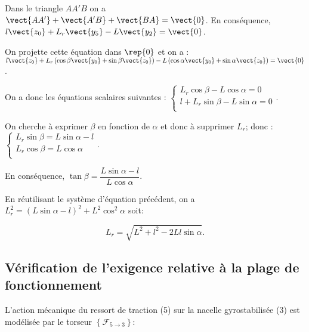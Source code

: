 \ifprof
\begin{corrige}
Dans le triangle $AA'B$ on a $\vect{AA'}+\vect{A'B}+\vect{BA}=\vect{0}$. 
En conséquence,  $l\vect{z_0}+L_r\vect{y_5}-L\vect{y_2}=\vect{0}$.

On projette cette équation dans $\rep{0}$ et on a : 
 $l\vect{z_0}+L_r\left(\cos\beta\vect{y_0}+\sin\beta\vect{z_0}\right)-L\left(\cos\alpha\vect{y_0}+\sin\alpha\vect{z_0}\right)=\vect{0}$.
 
 On a donc les équations scalaires suivantes : 
 $\left\{
 \begin{array}{l}
L_r\cos\beta-L\cos\alpha={0}\\
 l+L_r\sin\beta-L\sin\alpha={0} \\
 \end{array}
 \right.
 $. 
 
 On cherche à exprimer $\beta$ en fonction de $\alpha$ et donc à supprimer $L_r$; donc : 
  $\left\{
 \begin{array}{l}
 L_r\sin\beta=L\sin\alpha-l \\
 L_r\cos\beta=L\cos\alpha\\
 \end{array}
 \right.
 $. 
 
 En conséquence, $\boxed{\tan\beta = \dfrac{L\sin\alpha-l}{L\cos\alpha}}$.
\end{corrige}
\else
\fi

\ifprof
\begin{corrige}
En réutilisant le système d'équation précédent, on a $L_r^2 = \left(L\sin\alpha-l\right)^2+L^2\cos^2\alpha$ soit:

$$\boxed{L_r = \sqrt{L^2+l^2-2Ll\sin\alpha}}.$$
\end{corrige}
\else
\fi

\subsection{Vérification de l'exigence relative à la plage de fonctionnement}
\ifprof
\else
L'action mécanique du ressort de traction (5) sur la nacelle gyrostabilisée (3) est modélisée par le torseur $\left\{\mathcal{F}_{5 \rightarrow 3}\right\}:$

